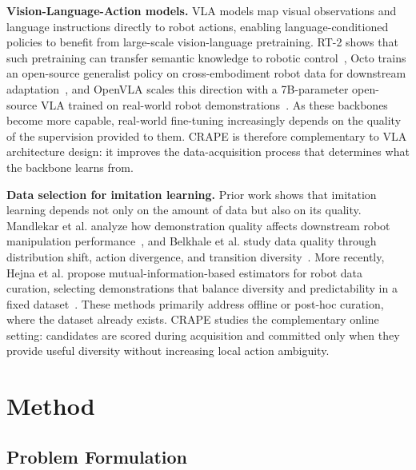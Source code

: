\documentclass{article}
\begin{document}
\textbf{Vision-Language-Action models.}
VLA models map visual observations and language instructions directly to robot actions, enabling language-conditioned policies to benefit from large-scale vision-language pretraining. 
RT-2 shows that such pretraining can transfer semantic knowledge to robotic control~\citep{zitkovich2023rt}, Octo trains an open-source generalist policy on cross-embodiment robot data for downstream adaptation~\citep{team2024octo}, and OpenVLA scales this direction with a 7B-parameter open-source VLA trained on real-world robot demonstrations~\citep{kim2024openvla}. 
As these backbones become more capable, real-world fine-tuning increasingly depends on the quality of the supervision provided to them. 
CRAPE is therefore complementary to VLA architecture design: it improves the data-acquisition process that determines what the backbone learns from.

\textbf{Data selection for imitation learning.}
Prior work shows that imitation learning depends not only on the amount of data but also on its quality. 
Mandlekar et al. analyze how demonstration quality affects downstream robot manipulation performance~\citep{mandlekar2021matters}, and Belkhale et al. study data quality through distribution shift, action divergence, and transition diversity~\citep{belkhale2023data}. 
More recently, Hejna et al. propose mutual-information-based estimators for robot data curation, selecting demonstrations that balance diversity and predictability in a fixed dataset~\citep{hejna2025robot}. 
These methods primarily address offline or post-hoc curation, where the dataset already exists. 
CRAPE studies the complementary online setting: candidates are scored during acquisition and committed only when they provide useful diversity without increasing local action ambiguity.
\section{Method}
\label{sec:method}
 
\subsection{Problem Formulation}
\label{sec:method:problem}
\end{document}
